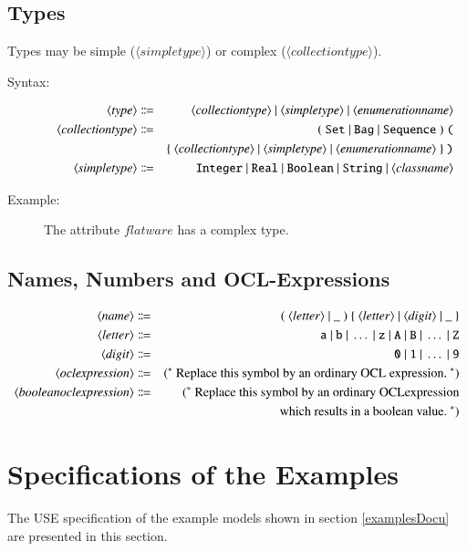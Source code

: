 \documentclass[a4paper,titlepage,oneside,final]{scrreprt} %
\begin{document}
\subsection{Types}
Types  may be simple ($\langle\mathit{simpletype}\rangle$) or complex
($\langle\mathit{collectiontype}\rangle$).
\begin{description}
\item[Syntax:]
\begin{eqnarray*}
\langle\mathit{type}\rangle &\Coloneqq& \langle\mathit{collectiontype}\rangle~
|~\langle\mathit{simpletype}\rangle~|~\langle\mathit{enumerationname}\rangle\\
\langle\mathit{collectiontype}\rangle &\Coloneqq& (~\verb+Set+~|~\verb+Bag+~|~\verb+Sequence+~)~
\verb+(+\\
&&\{~\langle\mathit{collectiontype}\rangle~
|~\langle\mathit{simpletype}\rangle~|~\langle\mathit{enumerationname}\rangle~\}~\verb+)+\\
\langle\mathit{simpletype}\rangle &\Coloneqq& \verb+Integer+~|~\verb+Real+~|~\verb+Boolean+~|~
\verb+String+~|~\langle\mathit{classname}\rangle
\end{eqnarray*}
\item[Example:] The attribute $\mathit{flatware}$ has a complex type.
\end{description}
\subsection{Names, Numbers and OCL-Expressions}
\begin{eqnarray*}
\langle\mathit{name}\rangle &\Coloneqq& (~\langle\mathit{letter}\rangle ~|~ \_~)~
\{~\langle\mathit{letter}\rangle~ |~ \langle\mathit{digit}\rangle ~|~ \_~\}\\
\langle\mathit{letter}\rangle &\Coloneqq&  \verb+a+~ |~ \verb+b+~
|~ \dots~ |~ \verb+z+~ | ~\verb+A+~ |~ \verb+B+~ |~ \dots~ | ~\verb+Z+\\
\langle\mathit{digit}\rangle &\Coloneqq& \verb+0+~ |~ \verb+1+~ |~ \dots~ |~ \verb+9+\\
\langle\mathit{oclexpression}\rangle &\Coloneqq&
(^*~\mathrm{Replace~this ~symbol~ by~ an ~ordinary ~OCL ~expression.}~^*)\\
\langle\mathit{booleanoclexpression}\rangle &\Coloneqq&
(^*~\mathrm{Replace~ this ~symbol~ by~ an~ ordinary~ OCL expression}\\
&&\mathrm{which~results ~in~ a ~boolean~ value.}~^*)
\end{eqnarray*}
\section{Specifications of the Examples}
The USE specification of the example models shown in section \ref{examplesDocu} are presented
in this section.
\end{document}
